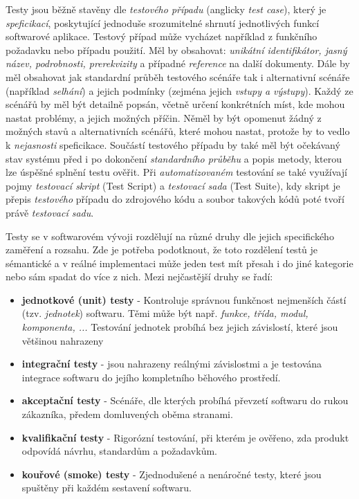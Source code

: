 \documentclass[czech, ma, kiv, he, iso690numb, pdf, viewonly]{fasthesis}
\begin{document}
    Testy jsou běžně stavěny dle \emph{testového případu} (anglicky \textit{test case}), který je \emph{speficikací}, poskytující jednoduše srozumitelné shrnutí jednotlivých funkcí softwarové aplikace. Testový případ může vycházet například z funkčního požadavku nebo případu použití. Měl by obsahovat: \textit{unikátní identifikátor, jasný název, podrobnosti, prerekvizity} a případné \textit{reference} na další dokumenty. Dále by měl obsahovat jak standardní průběh testového scénáře tak i alternativní scénáře (například \textit{selhání}) a jejich podmínky (zejména jejich \textit{vstupy a výstupy}). Každý ze scénářů by měl být detailně popsán, včetně určení konkrétních míst, kde mohou nastat problémy, a jejich možných příčin. Něměl by být opomenut žádný z možných stavů a alternativních scénářů, které mohou nastat, protože by to vedlo k \emph{nejasnosti} speficikace. Součástí testového případu by také měl být očekávaný stav systému před i po dokončení \emph{standardního průběhu} a popis metody, kterou lze úspěšné splnění testu ověřit. \cite{brada2023usecase} Při \textit{automatizovaném} testování se také využívají pojmy \textit{testovací skript} (Test Script) a \textit{testovací sada} (Test Suite), kdy skript je přepis \textit{testového} případu do zdrojového kódu a soubor takových kódů poté tvoří právě \textit{testovací sadu}. \cite{brada2015crashcourse}

    Testy se v softwarovém vývoji rozdělují na různé druhy dle jejich specifického zaměření a rozsahu. Zde je potřeba podotknout, že toto rozdělení testů je sémantické a v reálné implementaci může jeden test mít přesah i do jiné kategorie nebo sám spadat do více z nich. Mezi nejčastější druhy se řadí:
    \begin{itemize}
        \item \textbf{jednotkové (unit) testy} - Kontroluje správnou funkčnost nejmenších částí (tzv. \textit{jednotek}) softwaru. Těmi může být např. \textit{funkce, třída, modul, komponenta, ...} Testování jednotek probíhá bez jejich závislostí, které jsou většinou nahrazeny 
        \item \textbf{integrační testy} -  jsou nahrazeny reálnými závislostmi a je testována integrace softwaru do jejího kompletního běhového prostředí. 
        \item \textbf{akceptační testy} - Scénáře, dle kterých probíhá převzetí softwaru do rukou zákazníka, předem domluvených oběma stranami.
        \item \textbf{kvalifikační testy} - Rigorózní testování, při kterém je ověřeno, zda produkt odpovídá návrhu, standardům a požadavkům. 
        \item \textbf{kouřové (smoke) testy} - Zjednodušené a nenáročné testy, které jsou spuštěny při každém sestavení softwaru.
    \end{itemize}
 
\end{document}
